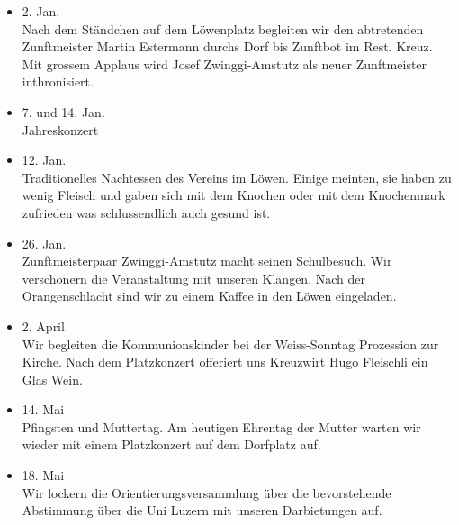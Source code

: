 \begin{multicols}{2}


    \begin{itemize}

        \item[]2. Jan.\\
        Nach dem Ständchen auf dem Löwenplatz begleiten wir den abtretenden
        Zunftmeister Martin Estermann durchs Dorf bis Zunftbot im Rest. Kreuz.
        Mit grossem Applaus wird Josef Zwinggi-Amstutz als neuer Zunftmeister
        inthronisiert.

        \item[]7. und 14. Jan.\\
        Jahreskonzert

        \item[]12. Jan.\\
        Traditionelles Nachtessen des Vereins im Löwen. Einige meinten, sie
        haben zu wenig Fleisch und gaben sich mit dem Knochen oder mit dem
        Knochenmark zufrieden was schlussendlich auch gesund ist.

        \item[]26. Jan.\\
        Zunftmeisterpaar Zwinggi-Amstutz macht seinen Schulbesuch. Wir
        verschönern die Veranstaltung mit unseren Klängen. Nach der
        Orangenschlacht sind wir zu einem Kaffee in den Löwen eingeladen.

        \item[]2. April\\
        Wir begleiten die Kommunionskinder bei der Weiss-Sonntag Prozession zur
        Kirche. Nach dem Platzkonzert offeriert uns Kreuzwirt Hugo Fleischli ein
        Glas Wein.

        \item[]14. Mai\\
        Pfingsten und Muttertag. Am heutigen Ehrentag der Mutter warten wir
        wieder mit einem Platzkonzert auf dem Dorfplatz auf.

        \item[]18. Mai\\
        Wir lockern die Orientierungsversammlung über die bevorstehende
        Abstimmung über die Uni Luzern mit unseren Darbietungen auf.


\end{itemize}
\end{multicols}
